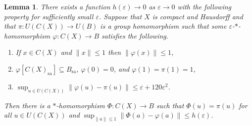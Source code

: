 \documentclass[11pt]{amsproc}
\theoremstyle{definition}
\theoremstyle{plain}
\newtheorem{lemma}[definition]{Lemma}
\theoremstyle{remark}
\begin{document}
\begin{lemma} \label{L.pi-to-rho-and-Phi} 
	There exists a function $h(\varepsilon)\to 0$ as $\varepsilon\to 0$ with the following property for sufficiently small $\varepsilon$. 
	Suppose that $X$ is compact and Hausdorff and that $\pi\colon U(C(X))\to U(B)$ is a group homomorphism such that some $\varepsilon$-$*$-homomorphism $\varphi\colon C(X)\to B$ satisfies the following.  
	\begin{enumerate}
		\item If $x\in C(X)$ and $\|x\|\leq 1$ then $\|\varphi(x)\|\leq 1$,
		\item $\varphi[C(X)_{\textrm{sa}}]\subseteq B_{\textrm{sa}}$,   $\varphi(0)=0$, and $\varphi(1)=\pi(1)=1$, 
		\item $\sup_{u\in U(C(X))} \|\varphi(u)-\pi(u)\|\leq \varepsilon+120\varepsilon^2$.   
	\end{enumerate} 
	Then there is a $*$-homomorphism $\Phi\colon C(X)\to B$ such that  $\Phi(u)=\pi(u)$ for all $u\in U(C(X))$ and 
	\(
	\sup_{\|a\|\leq 1} \|\Phi(a)-\varphi(a)\|\leq h(\varepsilon)\). 
\end{lemma}
\end{document}
